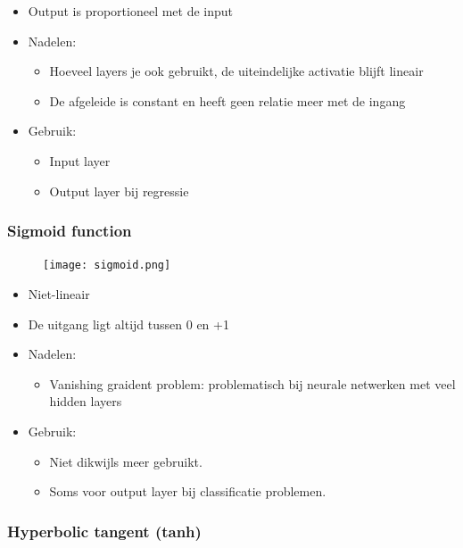 \documentclass{article}
\begin{document}
\begin{itemize}
    \item Output is proportioneel met de input
    \item Nadelen:
    \begin{itemize}
        \item Hoeveel layers je ook gebruikt, de uiteindelijke activatie blijft lineair
        \item De afgeleide is constant en heeft geen relatie meer met de ingang
    \end{itemize}
    \item Gebruik:
    \begin{itemize}
        \item Input layer
        \item Output layer bij regressie
    \end{itemize}
\end{itemize}

\subsubsection{Sigmoid function}

\begin{figure}[H]
    \centering
    \texttt{[image: sigmoid.png]}
\end{figure}

\begin{itemize}
    \item Niet-lineair
    \item De uitgang ligt altijd tussen 0 en +1
    \item Nadelen:
    \begin{itemize}
        \item Vanishing graident problem: problematisch bij neurale netwerken met veel hidden layers
    \end{itemize}
    \item Gebruik:
    \begin{itemize}
        \item Niet dikwijls meer gebruikt.
        \item Soms voor output layer bij classificatie problemen.
    \end{itemize}
\end{itemize}


\subsubsection{Hyperbolic tangent (tanh)}
\end{document}
